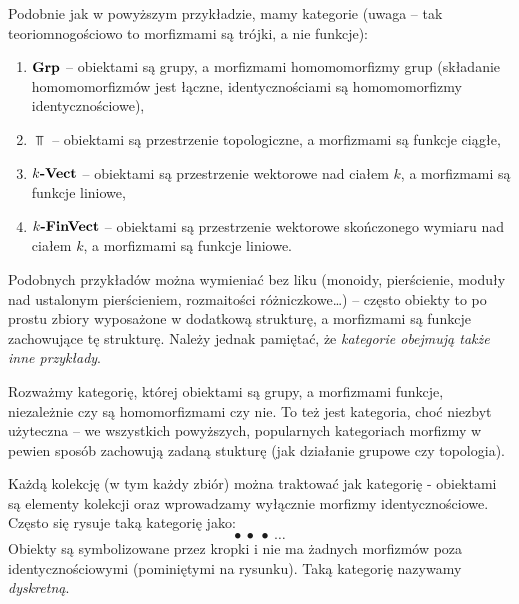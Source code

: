 \begin{exmp}
  \label{exmp:standard}
  Podobnie jak w powyższym przykładzie, mamy kategorie (uwaga -- tak teoriomnogościowo to morfizmami są trójki, a nie funkcje):
  \begin{enumerate}
    \item $\textbf{Grp}$ -- obiektami są grupy, a morfizmami homomomorfizmy grup (składanie homomomorfizmów jest łączne, identycznościami są homomomorfizmy identycznościowe),
    \item $\Top$ -- obiektami są przestrzenie topologiczne, a morfizmami są funkcje ciągłe,
    \item $k\textbf{-Vect}$ -- obiektami są przestrzenie wektorowe nad ciałem $k$, a morfizmami są funkcje liniowe,
    \item $k\textbf{-FinVect}$ -- obiektami są przestrzenie wektorowe skończonego wymiaru nad ciałem $k$, a morfizmami są funkcje liniowe.
  \end{enumerate}
  Podobnych przykładów można wymieniać bez liku (monoidy, pierścienie, moduły nad ustalonym pierścieniem, rozmaitości różniczkowe\dots) -- często obiekty to po prostu zbiory wyposażone w dodatkową strukturę, a morfizmami są funkcje zachowujące tę strukturę. Należy jednak pamiętać, że \emph{kategorie obejmują także inne przykłady}.
\end{exmp}

\begin{exmp}
  Rozważmy kategorię, której obiektami są grupy, a morfizmami funkcje, niezależnie czy są homomorfizmami czy nie. To też jest kategoria, choć niezbyt użyteczna -- we wszystkich powyższych, popularnych kategoriach morfizmy w pewien sposób zachowują zadaną stukturę (jak działanie grupowe czy topologia).
\end{exmp}

\begin{exmp}
  Każdą kolekcję (w tym każdy zbiór) można traktować jak kategorię - obiektami są elementy kolekcji oraz wprowadzamy wyłącznie morfizmy identycznościowe. Często się rysuje taką kategorię jako:
  $$\bullet~\bullet~\bullet~\dots $$
  Obiekty są symbolizowane przez kropki i nie ma żadnych morfizmów poza identycznościowymi (pominiętymi na rysunku). Taką kategorię nazywamy \emph{dyskretną}.
\end{exmp}


